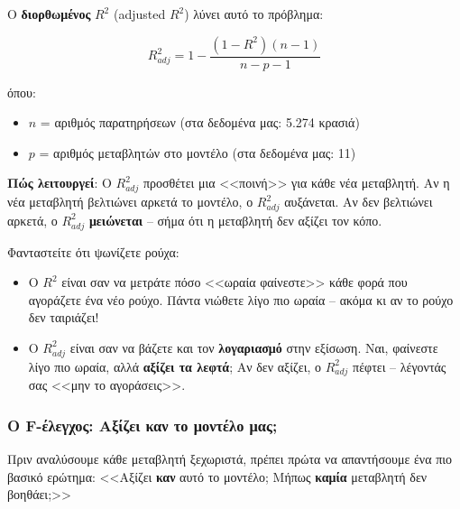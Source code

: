 \documentclass[12pt,a4paper]{article}
\begin{document}
\begin{theorybox}
Ο \textbf{διορθωμένος} $R^2$ (adjusted $R^2$) λύνει αυτό το πρόβλημα:

\begin{equation}
R^2_{adj} = 1 - \frac{(1 - R^2)(n - 1)}{n - p - 1}
\end{equation}

όπου:
\begin{itemize}
    \item $n$ = αριθμός παρατηρήσεων (στα δεδομένα μας: 5.274 κρασιά)
    \item $p$ = αριθμός μεταβλητών στο μοντέλο (στα δεδομένα μας: 11)
\end{itemize}

\textbf{Πώς λειτουργεί}: Ο $R^2_{adj}$ προσθέτει μια <<ποινή>> για κάθε νέα μεταβλητή. Αν η νέα μεταβλητή βελτιώνει αρκετά το μοντέλο, ο $R^2_{adj}$ αυξάνεται. Αν δεν βελτιώνει αρκετά, ο $R^2_{adj}$ \textbf{μειώνεται} -- σήμα ότι η μεταβλητή δεν αξίζει τον κόπο.
\end{theorybox}

\begin{examplebox}
Φανταστείτε ότι ψωνίζετε ρούχα:
\begin{itemize}
    \item Ο \textbf{$R^2$} είναι σαν να μετράτε πόσο <<ωραία φαίνεστε>> κάθε φορά που αγοράζετε ένα νέο ρούχο. Πάντα νιώθετε λίγο πιο ωραία -- ακόμα κι αν το ρούχο δεν ταιριάζει!
    \item Ο \textbf{$R^2_{adj}$} είναι σαν να βάζετε και τον \textbf{λογαριασμό} στην εξίσωση. Ναι, φαίνεστε λίγο πιο ωραία, αλλά \textbf{αξίζει τα λεφτά}; Αν δεν αξίζει, ο $R^2_{adj}$ πέφτει -- λέγοντάς σας <<μην το αγοράσεις>>.
\end{itemize}
\end{examplebox}

\subsubsection{Ο F-έλεγχος: Αξίζει καν το μοντέλο μας;}

Πριν αναλύσουμε κάθε μεταβλητή ξεχωριστά, πρέπει πρώτα να απαντήσουμε ένα πιο βασικό ερώτημα: <<Αξίζει \textbf{καν} αυτό το μοντέλο; Μήπως \textbf{καμία} μεταβλητή δεν βοηθάει;>>
\end{document}
